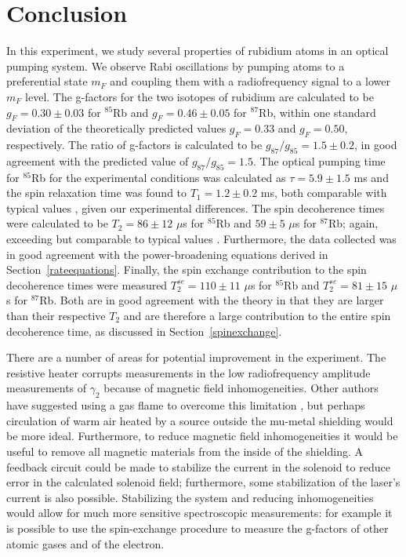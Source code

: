 
\section{Conclusion}\label{conclusion}

In this experiment, we study several properties of rubidium atoms in an optical pumping system. We observe Rabi oscillations by pumping atoms to a preferential state $m_{F}$ and coupling them with a radiofrequency signal to a lower $m_{F}$ level. The g-factors for the two isotopes of rubidium are calculated to be $g_{F}=0.30\pm0.03$ for $^{85}$Rb and $g_{F}=0.46\pm0.05$ for $^{87}$Rb, within one standard deviation of the theoretically predicted values $g_{F}=0.33$ and $g_{F}=0.50$, respectively. The ratio of g-factors is calculated to be $g_{87}/g_{85}=1.5\pm0.2$, in good agreement with the predicted value of $g_{87}/g_{85}=1.5$. The optical pumping time for $^{85}$Rb for the experimental conditions was calculated as $\tau = 5.9\pm 1.5$ ms and the spin relaxation time was found to $T_{1}=1.2 \pm 0.2$ ms, both comparable with typical values \cite{vanier}, given our experimental differences. The spin decoherence times were calculated to be $T_2 = 86 \pm 12$ $\mu$s for $^{85}$Rb and $59 \pm 5$ $\mu$s for $^{87}$Rb; again, exceeding but comparable to typical values \cite{vanier}. Furthermore, the data collected was in good agreement with the power-broadening equations derived in Section~\ref{rateequations}. Finally, the spin exchange contribution to the spin decoherence times were measured $T^{se}_2=110 \pm 11$ $\mu$s for  $^{85}$Rb and $T^{se}_2 = 81 \pm 15$ $\mu$s for  $^{87}$Rb. Both are in good agreement with the theory in that they are larger than their respective $T_{2}$ and are therefore a large contribution to the entire spin decoherence time, as discussed in Section~\ref{spinexchange}.

There are a number of areas for potential improvement in the experiment. The resistive heater corrupts measurements in the low radiofrequency amplitude measurements of $\gamma_{2}$ because of magnetic field inhomogeneities. Other authors have suggested using a gas flame to overcome this limitation \cite{benumof}, but perhaps circulation of warm air heated by a source outside the mu-metal shielding would be more ideal. Furthermore, to reduce magnetic field inhomogeneities it would be useful to remove all magnetic materials from the inside of the shielding. A feedback circuit could be made to stabilize the current in the solenoid to reduce error in the calculated solenoid field; furthermore, some stabilization of the laser's current is also possible. Stabilizing the system and reducing inhomogeneities would allow for much more sensitive spectroscopic measurements: for example it is possible to use the spin-exchange procedure to measure the g-factors of other atomic gases and of the electron.